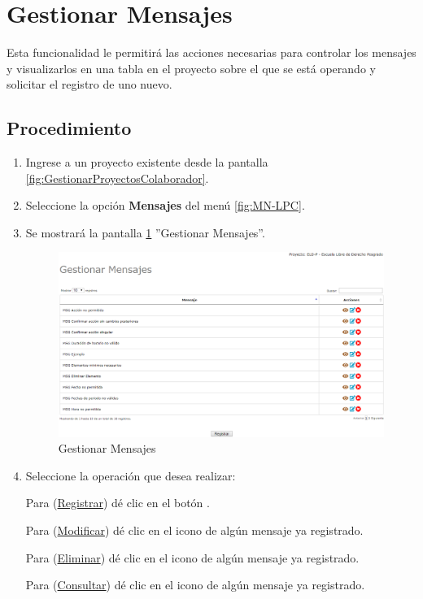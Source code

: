 \hypertarget{cv:GestionarGlosario}{\section{Gestionar Mensajes}} \label{sec:GestionarMensajes}

	Esta funcionalidad le permitirá las acciones necesarias para controlar los mensajes y visualizarlos en una tabla en el proyecto sobre el que se está operando y solicitar el registro de uno nuevo.

		\subsection{Procedimiento}

			\begin{enumerate}
				
			\item Ingrese a un proyecto existente desde la pantalla \ref{fig:GestionarProyectosColaborador}.
	
			\item Seleccione la opción \textbf{Mensajes} del menú \ref{fig:MN-LPC}.
	
			\item Se mostrará la pantalla \ref{fig:GestionarMensajes} ''Gestionar Mensajes''.

			\begin{figure}[h!]
				\begin{center}
					\includegraphics[scale=0.5]{roles/lider/mensajes/pantallas/IU9gestionarMensajes}
					\caption{Gestionar Mensajes}
					\label{fig:GestionarMensajes}
				\end{center}
			\end{figure}
		
				\item Seleccione la operación que desea realizar:
			
			Para (\hyperlink{cv:registrarMensaje}{Registrar}) dé clic en el botón \IURegistrar.
			
			Para (\hyperlink{cv:modificarMensaje}{Modificar}) dé clic en el icono \IUEditar{} de algún mensaje ya registrado.
			
			Para (\hyperlink{cv:eliminarMensaje}{Eliminar}) dé clic en el icono \IUBotonEliminar{} de algún mensaje ya registrado.
			
			Para (\hyperlink{cv:consultarMensaje}{Consultar}) dé clic en el icono \IUConsultar{} de algún mensaje ya registrado.
			\end{enumerate}
